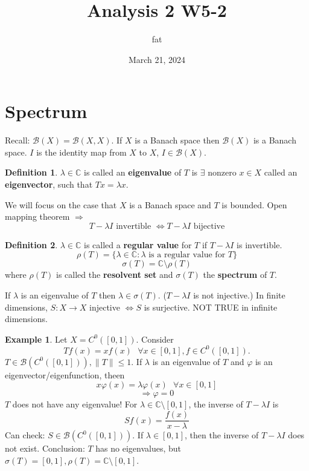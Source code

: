 \documentclass{article}
\title{Analysis 2 W5-2}
\author{fat}
\date{March 21, 2024}
\newcommand{\sfa}{\text{  } \forall}
\theoremstyle{definition}
\newtheorem{ex}{Example}
\newtheorem{dfn}{Definition}
\begin{document}
\maketitle
\thispagestyle{fancy}
\renewcommand{\footrulewidth}{0.4pt}
\cfoot{\thepage}
\renewcommand{\headrulewidth}{0.4pt}

\section{Spectrum}

Recall: $\mathcal{B}(X) = \mathcal{B}(X, X)$.
If $X$ is a Banach space then $\mathcal{B}(X)$ is a Banach space.
$I$ is the identity map from $X$ to $X$, $I \in \mathcal{B}(X)$.

\begin{dfn}
	$\lambda \in \mathbb{C}$ is called an \textbf{eigenvalue} of $T$ is $\exists$ nonzero $x \in X$ called an \textbf{eigenvector}, such that $T x = \lambda x$.
\end{dfn}	

We will focus on the case that $X$ is a Banach space and $T$ is bounded.
Open mapping theorem $\Rightarrow$
\[
	T - \lambda I \text{ invertible } \Leftrightarrow T - \lambda I \text{ bijective}
\]

\begin{dfn}
	$\lambda \in \mathbb{C}$ is called a \textbf{regular value} for $T$ if $T - \lambda I$ is invertible.
	\[
		\rho(T) = \{ \lambda \in \mathbb{C}: \lambda \text{ is a regular value for } T\}
	\]
	\[
		\sigma(T) = \mathbb{C} \setminus \rho(T)
	\]
	where $\rho(T)$ is called the \textbf{resolvent set} and $\sigma(T)$ the \textbf{spectrum} of $T$.
\end{dfn}

If $\lambda$ is an eigenvalue of $T$ then $\lambda \in \sigma(T)$. 
($T - \lambda I$ is not injective.)
In finite dimensions, $S:X \to X$ injective $\Leftrightarrow S$ is surjective.
NOT TRUE in infinite dimensions.

\begin{ex}
	Let $X = C^0([0, 1])$.
	Consider 
	\[
		T f(x) = x f(x) \sfa x \in [0, 1], f \in C^0([0, 1]).
	\]
	$T \in \mathcal{B}(C^0([0, 1])), \|T\| \leq 1$.
	If $\lambda$ is an eigenvalue of $T$ and $\varphi$ is an eigenvector/eigenfunction, theen
	\[
		x \varphi(x) = \lambda \varphi(x) \sfa x \in [0, 1]
	\]
	\[
		\Rightarrow \varphi = 0
	\]
	$T$ does not have any eigenvalue!
	For $\lambda \in \mathbb{C} \setminus [0, 1]$, the inverse of $T - \lambda I$ is 
	\[
		S f(x) = \frac{f(x)}{x - \lambda}
	\]
	Can check: $S \in \mathcal{B}(C^0([0, 1]))$.
	If $\lambda \in [0, 1]$, then the inverse of $T - \lambda I$ does not exist.
	Conclusion: $T$ has no eigenvalues, but $\sigma(T) = [0, 1], \rho(T) = \mathbb{C} \setminus [0, 1]$.
\end{ex}
\end{document}
